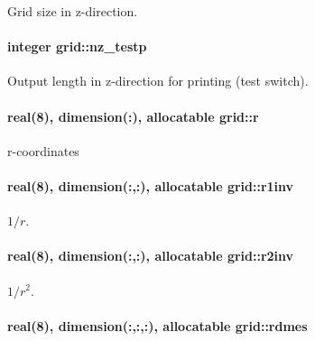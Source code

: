 Grid size in z-\/direction. 

\paragraph[{\texorpdfstring{nz\+\_\+testp}{nz_testp}}]{\setlength{\rightskip}{0pt plus 5cm}integer grid\+::nz\+\_\+testp}\hypertarget{namespacegrid_a8beb75ae0c827f8dea414882ff08e037}{}\label{namespacegrid_a8beb75ae0c827f8dea414882ff08e037}


Output length in z-\/direction for printing (test switch). 

\paragraph[{\texorpdfstring{r}{r}}]{\setlength{\rightskip}{0pt plus 5cm}real(8), dimension(\+:), allocatable grid\+::r}\hypertarget{namespacegrid_a179734537d519e50cb4330f69282778c}{}\label{namespacegrid_a179734537d519e50cb4330f69282778c}


r-\/coordinates 

\paragraph[{\texorpdfstring{r1inv}{r1inv}}]{\setlength{\rightskip}{0pt plus 5cm}real(8), dimension(\+:,\+:), allocatable grid\+::r1inv}\hypertarget{namespacegrid_a37bbb6d76b285961dc17e687364ba48d}{}\label{namespacegrid_a37bbb6d76b285961dc17e687364ba48d}


$ 1/r$. 

\paragraph[{\texorpdfstring{r2inv}{r2inv}}]{\setlength{\rightskip}{0pt plus 5cm}real(8), dimension(\+:,\+:), allocatable grid\+::r2inv}\hypertarget{namespacegrid_ac5d461ae0b4027338462085f7b2c117d}{}\label{namespacegrid_ac5d461ae0b4027338462085f7b2c117d}


$ 1/r^2$. 

\paragraph[{\texorpdfstring{rdmes}{rdmes}}]{\setlength{\rightskip}{0pt plus 5cm}real(8), dimension(\+:,\+:,\+:), allocatable grid\+::rdmes}\hypertarget{namespacegrid_a19320a5e6ed33bc3a07ef487bda6acff}{}\label{namespacegrid_a19320a5e6ed33bc3a07ef487bda6acff}


